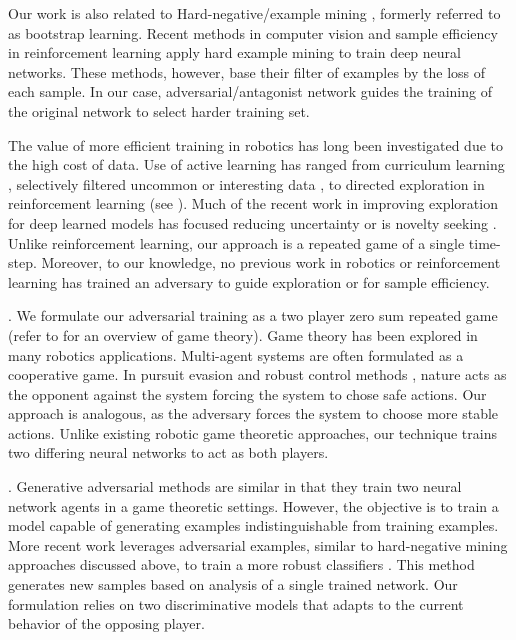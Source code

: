 \documentclass[letterpaper, 10 pt, conference]{ieeeconf}  %
\begin{document}
Our work is also related to Hard-negative/example mining \cite{sung1994learning, rowley1998neural}, formerly referred to as bootstrap learning. Recent methods in computer vision \cite{loshchilov2015online, simo2014fracking, wang2015unsupervised, shrivastava2016training} and sample efficiency in reinforcement learning \cite{schaul2015prioritized} apply hard example mining to train deep neural networks. These methods, however, base their filter of examples by the loss of each sample. In our case, 
 adversarial/antagonist network guides the training of the original network to select harder training set.

The value of more efficient training in robotics has long been investigated due to the high cost of data. Use of active learning has ranged from curriculum learning \cite{sanger1994neural}, selectively filtered uncommon or interesting data \cite{dima2004enabling}, to directed exploration in reinforcement learning (see \cite{thrun1992efficient}).  Much of the recent work in improving exploration for deep learned models has focused reducing uncertainty \cite{houthooft20015variational, osband2016deep} or is novelty seeking \cite{bellemare2016unifying, abel2016exploratory}. Unlike reinforcement learning, our approach is a repeated game of a single time-step.  Moreover, to our knowledge, no previous work in robotics or reinforcement learning has trained an adversary to guide exploration or for sample efficiency.

. 
We formulate our adversarial training as a two player zero sum repeated game (refer to \cite{basar1999dynamic} for an overview of game theory). Game theory has been explored in many robotics applications. Multi-agent systems \cite{stone2000multiagent, panait2005cooperative} are often formulated as a cooperative game. In pursuit evasion \cite{lavalle2000robot} and robust control methods \cite{bacsar2008h}, nature acts as the opponent against the system forcing the system to chose safe actions. Our approach is analogous, as the adversary forces the system to choose more stable actions. Unlike existing robotic game theoretic approaches, our technique trains two differing neural networks to act as both players.

. Generative adversarial methods \cite{goodfellow2014generative, dumoulin2016adversarially} are similar in that they train two neural network agents in a game theoretic settings. However, the objective is to train a model capable of generating examples indistinguishable from training examples. More recent work leverages adversarial examples, similar to hard-negative mining approaches discussed above, to train a more robust classifiers \cite{goodfellow2014explaining}. This method generates new samples based on analysis of a single trained network. Our formulation relies on two discriminative models that adapts to the current behavior of the opposing player.
\end{document}
